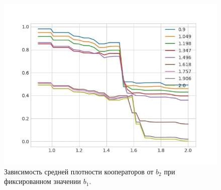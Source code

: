\documentclass[12pt]{article}
\begin{document}
    \begin{figure}[H]
         \centering
         \includegraphics[width=0.95\columnwidth, keepaspectratio=True]{DoubleField/many.jpg}
         \caption{Зависимость средней плотности кооператоров от $b_2$ при фиксированном значении $b_1$.}
         \label{fig:many}
    \end{figure}
\end{document}
